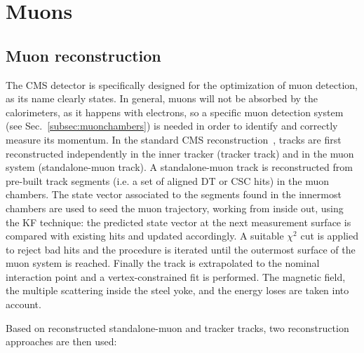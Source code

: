 \section{Muons}\label{sec:muons}

\subsection{Muon reconstruction}

The CMS detector is specifically designed for the optimization of muon detection, as its name clearly states. 
In general, muons will not be absorbed by the calorimeters, as it happens with electrons, so a specific muon detection system (see Sec.~\ref{subsec:muonchambers}) is needed in order to identify and correctly measure its momentum.
In the standard CMS reconstruction~\cite{Chatrchyan:2012xi}, tracks are first reconstructed independently in the inner tracker (tracker track) and in the muon system (standalone-muon track).
A standalone-muon track is reconstructed from pre-built track segments (i.e. a set of aligned DT or CSC hits) in the muon chambers. The state vector associated to the segments found in the innermost chambers are used to seed the muon trajectory, working from inside out, using the KF technique: the predicted state vector at the next measurement surface is compared with existing hits and updated accordingly. A suitable $\chi^2$ cut is applied to reject bad hits and the procedure is iterated until the outermost surface of the muon system is reached. Finally the track is extrapolated to the nominal interaction point and a vertex-constrained fit is performed. The magnetic field, the multiple scattering inside the steel yoke, and the energy loses are taken into account.

Based on reconstructed standalone-muon and tracker tracks, two reconstruction approaches are then used:

